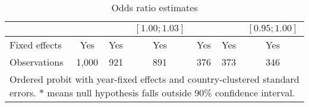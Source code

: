 \begin{table}[h]
\begin{center}
{\begin{tabular}{l c c c c c c}
                &                 &                 & $ [1.00; 1.03]$ &                 &                 & $ [0.95; 1.00]$ \\
\hline
Fixed effects   & Yes             & Yes             & Yes             & Yes             & Yes             & Yes             \\
Observations    & 1,000           & 921             & 891             & 376             & 373             & 346             \\
\hline
\multicolumn{7}{l}{\scriptsize{Ordered probit with year-fixed effects and country-clustered standard errors. $*$ means null hypothesis falls outside 90\% confidence interval.}}
\end{tabular}
}
\caption{Odds ratio estimates}
\label{table:model}
\end{center}
\end{table}
